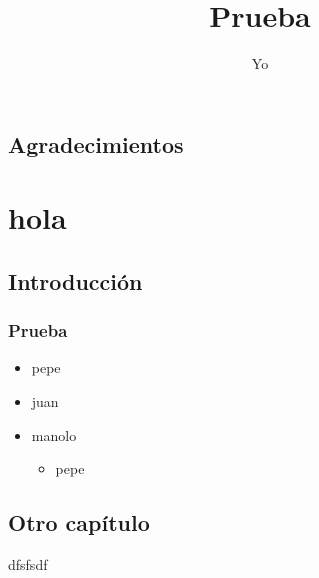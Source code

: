 \documentclass[a4paper,11pt]{memoir}
\title{Prueba}
\author{Yo}
\begin{document}
\frontmatter

\tableofcontents

\chapter{Agradecimientos}

\mainmatter

\part{hola}

\chapter{Introducción}

\section{Prueba}

\lipsum


\begin{itemize}
  \item pepe
  \item juan
  \item manolo
  \begin{itemize}
    \item pepe
  \end{itemize}
\end{itemize}


\chapter{Otro capítulo}

dfsfsdf
\end{document}
